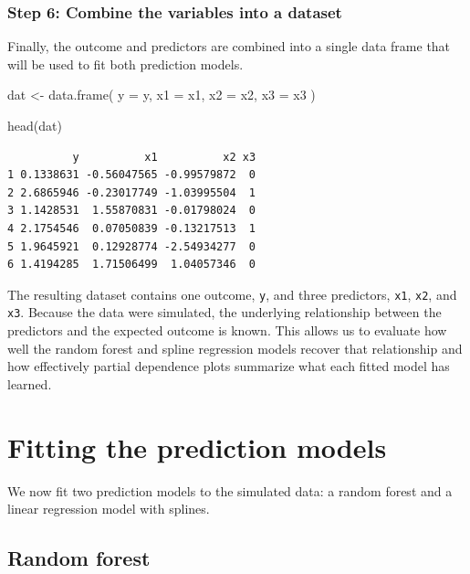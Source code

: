 \documentclass[
  letterpaper,
  DIV=11,
  numbers=noendperiod]{scrreprt}
\newenvironment{Shaded}{\begin{snugshade}}{\end{snugshade}}
\newcommand{\AttributeTok}[1]{\textcolor[rgb]{0.40,0.45,0.13}{#1}}
\newcommand{\FunctionTok}[1]{\textcolor[rgb]{0.28,0.35,0.67}{#1}}
\newcommand{\NormalTok}[1]{\textcolor[rgb]{0.00,0.23,0.31}{#1}}
\newcommand{\OtherTok}[1]{\textcolor[rgb]{0.00,0.23,0.31}{#1}}
\begin{document}
\subsubsection{Step 6: Combine the variables into a
dataset}\label{step-6-combine-the-variables-into-a-dataset}

Finally, the outcome and predictors are combined into a single data
frame that will be used to fit both prediction models.

\begin{Shaded}
\begin{Highlighting}[]
\NormalTok{dat }\OtherTok{\textless{}{-}} \FunctionTok{data.frame}\NormalTok{(}
  \AttributeTok{y =}\NormalTok{ y,}
  \AttributeTok{x1 =}\NormalTok{ x1,}
  \AttributeTok{x2 =}\NormalTok{ x2,}
  \AttributeTok{x3 =}\NormalTok{ x3}
\NormalTok{)}

\FunctionTok{head}\NormalTok{(dat)}
\end{Highlighting}
\end{Shaded}

\begin{verbatim}
          y          x1          x2 x3
1 0.1338631 -0.56047565 -0.99579872  0
2 2.6865946 -0.23017749 -1.03995504  1
3 1.1428531  1.55870831 -0.01798024  0
4 2.1754546  0.07050839 -0.13217513  1
5 1.9645921  0.12928774 -2.54934277  0
6 1.4194285  1.71506499  1.04057346  0
\end{verbatim}

The resulting dataset contains one outcome, \texttt{y}, and three
predictors, \texttt{x1}, \texttt{x2}, and \texttt{x3}. Because the data
were simulated, the underlying relationship between the predictors and
the expected outcome is known. This allows us to evaluate how well the
random forest and spline regression models recover that relationship and
how effectively partial dependence plots summarize what each fitted
model has learned.

\section{Fitting the prediction
models}\label{fitting-the-prediction-models}

We now fit two prediction models to the simulated data: a random forest
and a linear regression model with splines.

\subsection{Random forest}\label{random-forest}
\end{document}
